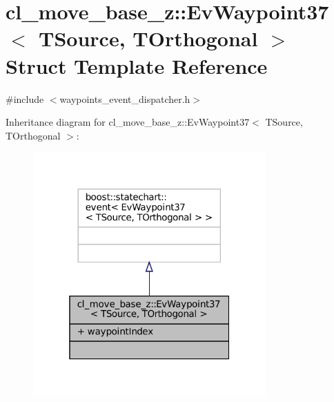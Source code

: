 \hypertarget{structcl__move__base__z_1_1EvWaypoint37}{}\section{cl\+\_\+move\+\_\+base\+\_\+z\+:\+:Ev\+Waypoint37$<$ T\+Source, T\+Orthogonal $>$ Struct Template Reference}
\label{structcl__move__base__z_1_1EvWaypoint37}


{\ttfamily \#include $<$waypoints\+\_\+event\+\_\+dispatcher.\+h$>$}



Inheritance diagram for cl\+\_\+move\+\_\+base\+\_\+z\+:\+:Ev\+Waypoint37$<$ T\+Source, T\+Orthogonal $>$\+:
\nopagebreak
\begin{figure}[H]
\begin{center}
\leavevmode
\includegraphics[width=253pt]{structcl__move__base__z_1_1EvWaypoint37__inherit__graph}
\end{center}
\end{figure}


